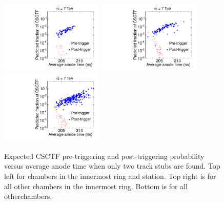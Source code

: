 \begin{figure}
  \begin{center}
      \includegraphics[clip=true, trim=0.0cm 0cm 0.0cm 0cm, width=0.44\textwidth]{figures/timing/ME11_Anode_vs_TF_all} 
      \includegraphics[clip=true, trim=0.0cm 0cm 0.0cm 0cm, width=0.44\textwidth]{figures/timing/Ring1_not11_Anode_vs_TF_all} \\
      \includegraphics[clip=true, trim=0.0cm 0cm 0.0cm 0cm, width=0.44\textwidth]{figures/timing/Ring2_Anode_vs_TF_all} \\
      \caption[Excpected CSCTF pre-triggering and post-triggering probability versus average anode time]
      {Expected CSCTF pre-triggering and post-triggering probability versus average anode time when only two track stubs are found.
Top left for chambers in the innermost ring and station. Top right is for all other chambers in the innermost ring.
Bottom is for all otherchambers.
        }
      \label{fig:AnodevsprePostCSCTF}
  \end{center}
\end{figure}

